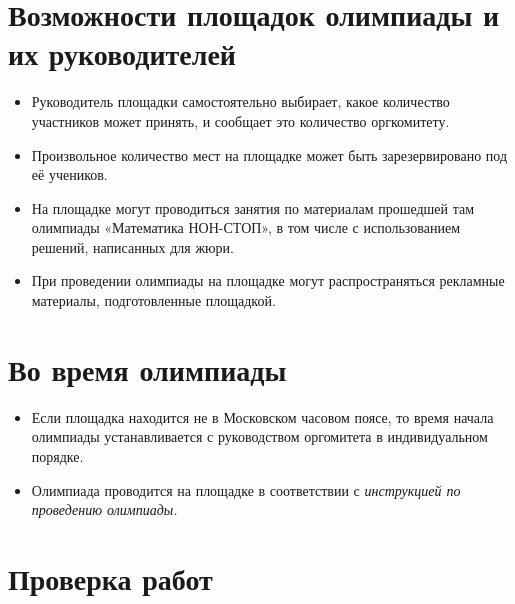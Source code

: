 \documentclass[a4paper,12pt]{article}
\newcommand{\mns}{«Математика НОН-СТОП»\xspace}
\begin{document}
\section{Возможности площадок олимпиады и их руководителей}

\begin{itemize}
	\item Руководитель площадки самостоятельно выбирает, какое количество участников может принять, и сообщает это количество оргкомитету.
	\item Произвольное количество мест на площадке может быть зарезервировано под её учеников.
	\item На площадке могут проводиться занятия по материалам прошедшей там олимпиады \mns, в том числе с использованием решений, написанных для жюри.
	\item При проведении олимпиады на площадке могут распространяться рекламные материалы, подготовленные площадкой.
\end{itemize}

\section{Во время олимпиады}

\begin{itemize}
	\item Если площадка находится не в Московском часовом поясе, то время начала олимпиады устанавливается с руководством оргомитета в индивидуальном порядке.
	\item Олимпиада проводится на площадке в соответствии с {\it инструкцией по проведению олимпиады.}
\end{itemize}

\section{Проверка работ}
\end{document}
